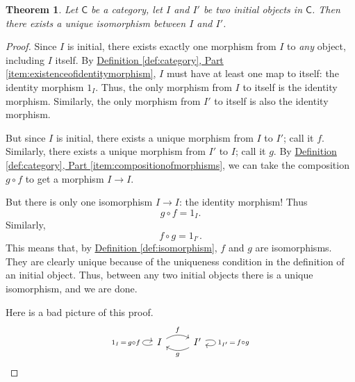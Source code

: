 \documentclass[a4paper,10pt]{scrreprt}
\theoremstyle{definition}
\theoremstyle{plain}
\newtheorem{theorem}{Theorem}[section]
\theoremstyle{remark}
\begin{document}
\begin{theorem}
  Let $\mathsf{C}$ be a category, let $I$ and $I'$ be two initial objects in $\mathsf{C}$. Then there exists a unique isomorphism between $I$ and $I'$.
  \label{thm:allinitialobjectsareuniquelyisomorphic}
\end{theorem}
\begin{proof}
  Since $I$ is initial, there exists exactly one morphism from $I$ to \emph{any} object, including $I$ itself. By \hyperref[item:existenceofidentitymorphism]{Definition \ref*{def:category}, Part \ref*{item:existenceofidentitymorphism}}, $I$ must have at least one map to itself: the identity morphism $1_{I}$. Thus, the only morphism from $I$ to itself is the identity morphism. Similarly, the only morphism from $I'$ to itself is also the identity morphism.

  But since $I$ is initial, there exists a unique morphism from $I$ to $I'$; call it $f$. Similarly, there exists a unique morphism from $I'$ to $I$; call it $g$. By \hyperref[item:compositionofmorphisms]{Definition \ref*{def:category}, Part \ref*{item:compositionofmorphisms}}, we can take the composition $g \circ f$ to get a morphism $I \to I$.

  But there is only one isomorphism $I \to I$: the identity morphism! Thus
  \begin{equation*}
    g \circ f = 1_{I}.
  \end{equation*}
  Similarly, 
  \begin{equation*}
    f \circ g  = 1_{I'}.
  \end{equation*}
  This means that, by \hyperref[def:isomorphism]{Definition \ref*{def:isomorphism}}, $f$ and $g$ are isomorphisms. They are clearly unique because of the uniqueness condition in the definition of an initial object. Thus, between any two initial objects there is a unique isomorphism, and we are done.

  Here is a bad picture of this proof.
  \begin{equation*}
    \begin{tikzcd}
      I \arrow[loop left, "1_{I} \,=\, g \circ f"] \arrow[r, bend left, "f"] & I' \arrow[l, bend left, "g"] \arrow[loop right, "1_{I'} \,=\, f \circ g"]
    \end{tikzcd}
  \end{equation*}
\end{proof}
\end{document}
